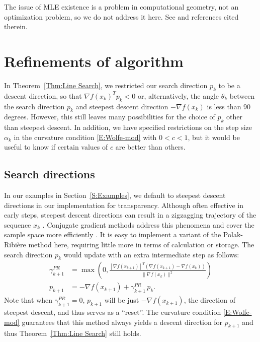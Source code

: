 \documentclass[oneside]{myumnStatThesis}
\begin{document}
The issue of MLE existence is a problem in computational geometry, not an optimization problem, so we do not address it 
here.  See \citep{Geyer:gdor,Rinaldo:2009} and references cited therein.

\chapter{Refinements of algorithm}

In Theorem~\ref{Thm:Line Search}, we restricted our search direction $p_k$ to be a descent direction, so that $\nabla f
(x_k)^T p_k < 0$ or, alternatively, the angle $\theta_k$ between the search direction $p_k$ and steepest descent 
direction $-\nabla f(x_k)$ is less than 90 degrees.  However, this still leaves many possibilities for the choice of 
$p_k$ other than steepest descent.  In addition, we have specified restrictions on the step size $\alpha_k$ in the 
curvature condition \eqref{E:Wolfe-mod} with $0 < c < 1$, but it would be useful to know if certain values of $c$ are 
better than others.

\section{Search directions}
In our examples in Section~\ref{S:Examples}, we default to steepest descent directions in our implementation for 
transparency.  Although often effective in early steps, steepest descent directions can result in a zigzagging 
trajectory of the sequence $x_k$ \citep{Sun:2006}.  Conjugate gradient methods address this phenomena and cover the 
sample space more efficiently \citep{NW}.  It is easy to implement a variant of the Polak-Ribi\`{e}re method
\citep[pp.~120--122]{NW} here, requiring little more in terms of calculation or storage.  The search direction $p_k$ would update 
with an extra intermediate step as follows:
\begin{align*}
	\gamma_{k+1}^{PR} &= \max \left( 0, \frac{ [ \nabla f( x_{k+1}) ]^T( \nabla f( x_{k+1} ) - \nabla f( x_k) )  }
{ \lVert \nabla f( x_k) \rVert^2 } \right )\\
	p_{k+1} &= -\nabla f( x_{k+1}) + \gamma_{k+1}^{PR} \, p_k.
\end{align*}
Note that when $\gamma_{k+1}^{PR} = 0$, $p_{k+1}$ will be just $-\nabla f( x_{k+1})$, the direction of steepest 
descent, and thus serves as a ``reset''.  The curvature condition \eqref{E:Wolfe-mod} guarantees that this method always 
yields a descent direction for $p_{k+1}$ and thus Theorem~\ref{Thm:Line Search} still holds.  
\end{document}
